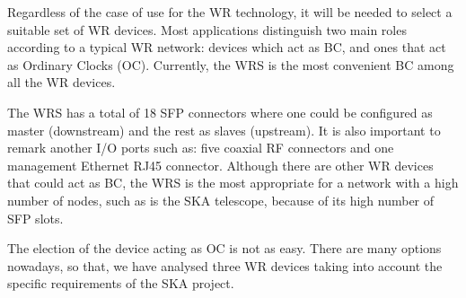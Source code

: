 Regardless of the case of use for the WR technology, it will be needed to 
select a suitable set of WR devices. Most applications distinguish two main 
roles according to a typical WR network: devices which act as BC, and ones 
that act as Ordinary Clocks (OC). Currently, the WRS \cite{ohwr:wrs} is the 
most convenient BC among all the WR devices. 

The WRS has a total of 18 SFP connectors where one could be configured as 
master (downstream) and the rest as slaves (upstream). It is also important to 
remark another I/O ports such as: five coaxial RF connectors and one management 
Ethernet RJ45 connector. Although there are other WR devices that could act as 
BC, the WRS is the most appropriate for a network with a high number of nodes, 
such as is the SKA telescope, because of its high number of SFP slots.

The election of the device acting as OC is not as easy. There are many options 
nowadays, so that, we have analysed three WR devices taking into account the 
specific requirements of the SKA project.


